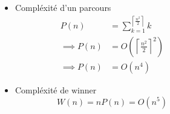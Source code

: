 \documentclass{beamer}
\begin{document}
\begin{frame}
  \begin{columns}
    \begin{column}{5cm}
      \begin{HexBoard}[board size=5,hex height=0.5cm]
      \end{HexBoard}
    \end{column}
    \begin{column}{5cm}
    \begin{itemize}
      \item Compléxité d'un parcours
      \begin{align*}
        P(n) &= \sum^{\left\lceil\frac{n^2}{2}\right\rceil}_{k = 1} k \\
        \implies P(n) &= O\left(\left\lceil\frac{n^2}{2}\right\rceil^2\right) \\
        \implies P(n) &= O\left(n^4\right)
      \end{align*}
      \item Compléxité de $\mathrm{winner}$
      \[
        W(n) = n P(n) = O\left(n^5\right)
      \]
    \end{itemize}
    \end{column}
  \end{columns}
\end{frame}
\end{document}
